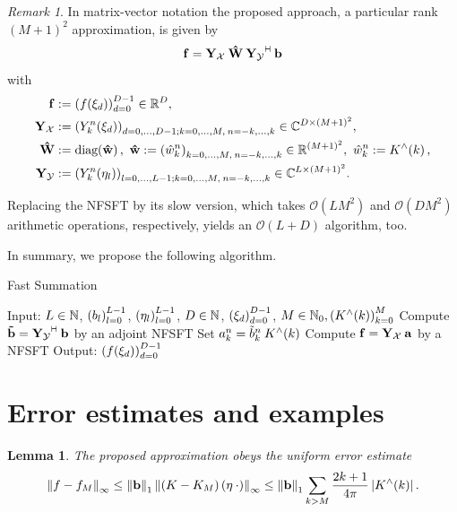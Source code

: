 \documentclass[11pt,a4paper,twoside,bibtotoc]{scrartcl}
\theoremstyle{plain}
\newtheorem{lemma}[theorem]{Lemma}
\theoremstyle{definition}
\theoremstyle{remark}
\newtheorem{remark}[theorem]{Remark}
\newcommand{\adj}{{\vdash \hspace*{-1.72mm} \dashv}}
\numberwithin{equation}{section}
\numberwithin{table}{section}
\numberwithin{figure}{section}
\begin{document}
\begin{remark}
In matrix-vector notation the proposed approach, a particular rank $(M+1)^2$
approximation, is given by
\[
  \V{f} = \V{Y_{\mathcal{X}}} \: \V{\hat W} \:
  \V{Y_{\mathcal{Y}}}^{\adj} \: \V{b}
\]
with
\begin{align}
  \nonumber
  \mathbf{f} & := \left(f{\hspace{-0.4ex}}\left(\mathbf{\xi}_{d}\right)\right)_{d=0}^{D-1} \in \mathbb{R}^D,
  \\ \nonumber
  \mathbf{Y_{\mathcal{X}}} & := \left(Y_k^n{\hspace{-0.4ex}}\left(\mathbf{\xi}_{d}\right)\right)_{d=0,\ldots,D-1;
  k=0,\ldots,M,\:n=-k,\ldots,k} \in \mathbb{C}^{D \times
  \left(M+1\right)^2}, \\ \nonumber
  \mathbf{\hat W} & := \text{\rm{diag}}{\hspace{-0.4ex}}\left(\mathbf{\hat w}\right),\ \mathbf{\hat w} := \left(\hat
  w_{k}^{n}\right)_{k=0,\ldots,M,\:n=-k,\ldots,k} \in \mathbb{R}^{(M+1)^2},\ \hat w_{k}^n :=
  K^{\wedge}{\hspace{-0.4ex}}\left(k\right), \\ \nonumber
  \mathbf{Y_{\mathcal{Y}}} & := \left(Y_k^n{\hspace{-0.4ex}}\left(\mathbf{\eta}_{l}\right)\right)_{l=0,\ldots,L-1;
  k=0,\ldots,M,\:n=-k,\ldots,k} \in \mathbb{C}^{L \times \left(M+1\right)^2}.
\end{align}

Replacing the NFSFT by its slow version, which takes $\mathcal{O}(L M^2)$ and
$\mathcal{O}(D M^2)$ arithmetic operations, respectively, yields an
$\mathcal{O}(L+D)$ algorithm, too.
\end{remark}

In summary, we propose the following algorithm.
\begin{algorithm}[h]
  \caption{Fast Summation}
  \label{Applications:Algorithm:FastSummation}    
  \begin{algorithmic}
    \STATE  Input:  $L \in \mathbb{N}$, $\left(b_{l}\right)_{l=0}^{L-1}$, $\left(\mathbf{\eta}_{l}\right)_{l=0}^{L-1}$, 
                    $D \in \mathbb{N}$, $\left(\mathbf{\xi}_{d}\right)_{d=0}^{D-1}$, $M \in \mathbb{N}_{0}, \left(K^{\wedge}{\hspace{-0.4ex}}\left(k\right)\right)_{k=0}^M$
    \STATE
    \STATE Compute $\V{\tilde{b}}= \V{Y_{\mathcal{Y}}}^{\adj} \: \V{b}$ by an
                    adjoint NFSFT 
    \STATE 
        \STATE Set $a_{k}^n = \tilde{b}_{k}^n \: K^{\wedge}{\hspace{-0.4ex}}\left(k\right)$
      \ENDFOR
    \ENDFOR
    \STATE
    \STATE Compute $\mathbf{f} = \mathbf{Y_{\mathcal{X}}} \: \mathbf{a}$ by a NFSFT
    \STATE
    \STATE Output: $\left(f{\hspace{-0.4ex}}\left(\mathbf{\xi}_{d}\right)\right)_{d=0}^{D-1}$
\end{algorithmic}
\end{algorithm}


\section{Error estimates and examples}
\label{Basics:SphericalKernels}
\begin{lemma}\label{lemma:error}
  The proposed approximation obeys the uniform error estimate
  \begin{equation}
    \left\|f - f_{M}\right\|_{\infty} \le
    \left\|\mathbf{b}\right\|_1 \left\|\left(K-K_M\right){\hspace{-0.4ex}}\left(\mathbf{\eta} \: \cdot
      \right)\right\|_{\infty} \le \left\|\mathbf{b}\right\|_1 \sum_{k>M}
    \frac{2k+1}{4\pi} \left\vert K^{\wedge}{\hspace{-0.4ex}}\left(k\right)\right\vert.
  \end{equation}
\end{lemma}
\end{document}
